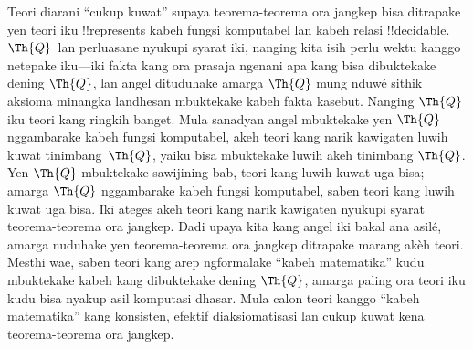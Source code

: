 \documentclass[../../../include/open-logic-section]{subfiles}
\begin{document}
Teori diarani ``cukup kuwat'' supaya
teorema-teorema ora jangkep bisa ditrapake
yen teori iku !!{represents} kabeh fungsi
komputabel lan kabeh relasi !!{decidable}.
$\Th{Q}$~lan perluasane nyukupi syarat iki,
nanging kita isih perlu wektu kanggo netepake
iku---iki fakta kang ora prasaja ngenani apa
kang bisa dibuktekake dening $\Th{Q}$,
lan angel dituduhake amarga $\Th{Q}$ mung
nduwé sithik aksioma minangka landhesan
mbuktekake kabeh fakta kasebut. Nanging
$\Th{Q}$ iku teori kang ringkih banget.
Mula sanadyan angel mbuktekake yen
$\Th{Q}$ nggambarake kabeh fungsi komputabel,
akeh teori kang narik kawigaten luwih
kuwat tinimbang~$\Th{Q}$, yaiku bisa
mbuktekake luwih akeh tinimbang $\Th{Q}$.
Yen $\Th{Q}$ mbuktekake sawijining bab,
teori kang luwih kuwat uga bisa; amarga
$\Th{Q}$ nggambarake kabeh fungsi komputabel,
saben teori kang luwih kuwat uga bisa.
Iki ateges akeh teori kang narik kawigaten
nyukupi syarat teorema-teorema ora jangkep.
Dadi upaya kita kang angel iki bakal ana
asilé, amarga nuduhake yen teorema-teorema
ora jangkep ditrapake marang akèh teori.
Mesthi wae, saben teori kang arep
ngformalake ``kabeh matematika'' kudu
mbuktekake kabeh kang dibuktekake
dening $\Th{Q}$, amarga paling ora teori
iku kudu bisa nyakup asil komputasi dhasar.
Mula calon teori kanggo ``kabeh matematika'' kang
konsisten, efektif diaksiomatisasi lan cukup kuwat
kena teorema-teorema ora jangkep.
\end{document}
